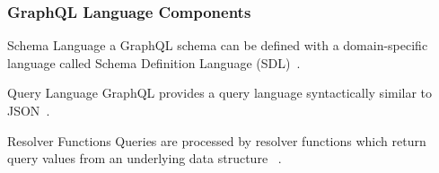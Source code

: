 \begin{frame}\frametitle{GraphQL Language Components}

\begin{block}{Schema Language}
a GraphQL schema can be defined with a domain-specific language called Schema Definition Language (SDL)~\cite{migrating-to-gql,gql-on-graph-db}.
\end{block}

\begin{block}{Query Language}
GraphQL provides a query language syntactically similar to JSON~\cite{gql-on-graph-db,initial-analysis-of-gql}. 
\end{block}

\begin{block}{Resolver Functions}
Queries are processed by resolver functions which return query values from an underlying data structure  ~\cite{migrating-to-gql,real-time-sys-arc-based-on-gql}.
\end{block}

\end{frame}





